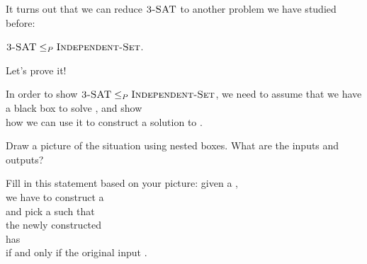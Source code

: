 \documentclass{tufte-handout}
\begin{document}
\pause

It turns out that we can reduce $\textsc{3-SAT}$ to another problem we
have studied before:

\begin{thm}
  $\textsc{3-SAT} \leq_P \textsc{Independent-Set}$.
\end{thm}

\noindent Let's prove it!

\begin{questions}
\item In order to show
  $\textsc{3-SAT} \leq_P \textsc{Independent-Set}$, we need to assume that we
  have a black box to solve \blank, and show\\ how we can use it to
  construct a solution to \blank.
\item Draw a picture of the situation using nested boxes.  What are
  the inputs and outputs?
\item Fill in this statement based on your picture: given a \blank,\\ we
  have to construct a \blank\\ and pick a \blank such that\\ the newly constructed \blank\\
  has \blank\\ if and only if the original input \blank.
\end{questions}
\end{document}
